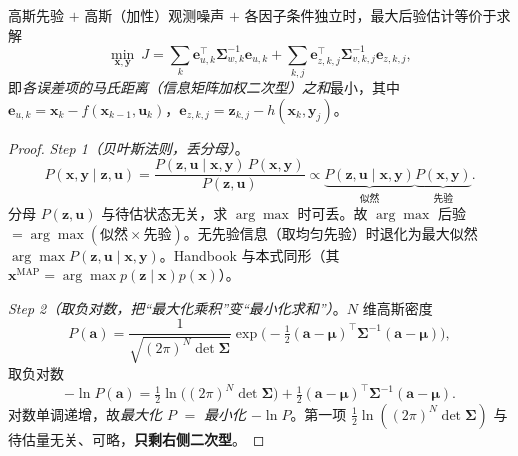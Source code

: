 \begin{theorem}\label{thm:nlopt-map}
高斯先验 $+$ 高斯（加性）观测噪声 $+$ 各因子条件独立时，最大后验估计等价于求解
\begin{equation}
  \min_{\mathbf{x},\mathbf{y}}\ J=\sum_k\mathbf{e}_{u,k}^\top\boldsymbol{\Sigma}_{w,k}^{-1}\mathbf{e}_{u,k}
  +\sum_{k,j}\mathbf{e}_{z,k,j}^\top\boldsymbol{\Sigma}_{v,k,j}^{-1}\mathbf{e}_{z,k,j},
  \label{eq:nlopt-batch-ls}
\end{equation}
即\emph{各误差项的马氏距离（信息矩阵加权二次型）之和}最小，其中 $\mathbf{e}_{u,k}=\mathbf{x}_k-f(\mathbf{x}_{k-1},\mathbf{u}_k)$，$\mathbf{e}_{z,k,j}=\mathbf{z}_{k,j}-h(\mathbf{x}_k,\mathbf{y}_j)$。
\end{theorem}
\begin{proof}
\emph{Step 1（贝叶斯法则，丢分母）}。
\begin{equation}
  P(\mathbf{x},\mathbf{y}\mid\mathbf{z},\mathbf{u})=\frac{P(\mathbf{z},\mathbf{u}\mid\mathbf{x},\mathbf{y})\,P(\mathbf{x},\mathbf{y})}{P(\mathbf{z},\mathbf{u})}\propto\underbrace{P(\mathbf{z},\mathbf{u}\mid\mathbf{x},\mathbf{y})}_{\text{似然}}\underbrace{P(\mathbf{x},\mathbf{y})}_{\text{先验}}.
  \label{eq:nlopt-bayes}
\end{equation}
分母 $P(\mathbf{z},\mathbf{u})$ 与待估状态无关，求 $\arg\max$ 时可丢。故 $\arg\max$ 后验 $=\arg\max(\text{似然}\times\text{先验})$。无先验信息（取均匀先验）时退化为最大似然 $\arg\max P(\mathbf{z},\mathbf{u}\mid\mathbf{x},\mathbf{y})$。Handbook\cite{carlone2026handbook} 与本式同形（其 $\mathbf{x}^{\text{MAP}}=\arg\max p(\mathbf{z}\mid\mathbf{x})p(\mathbf{x})$）。

\emph{Step 2（取负对数，把“最大化乘积”变“最小化求和”）}。$N$ 维高斯密度
\begin{equation}
  P(\mathbf{a})=\frac{1}{\sqrt{(2\pi)^N\det\boldsymbol{\Sigma}}}\exp\!\Big(-\tfrac12(\mathbf{a}-\boldsymbol{\mu})^\top\boldsymbol{\Sigma}^{-1}(\mathbf{a}-\boldsymbol{\mu})\Big),
  \label{eq:nlopt-gauss}
\end{equation}
取负对数
\begin{equation}
  -\ln P(\mathbf{a})=\tfrac12\ln\big((2\pi)^N\det\boldsymbol{\Sigma}\big)+\tfrac12(\mathbf{a}-\boldsymbol{\mu})^\top\boldsymbol{\Sigma}^{-1}(\mathbf{a}-\boldsymbol{\mu}).
  \label{eq:nlopt-neglog}
\end{equation}
对数单调递增，故\emph{最大化 $P$} $=$ \emph{最小化 $-\ln P$}。第一项 $\tfrac12\ln((2\pi)^N\det\boldsymbol{\Sigma})$ 与待估量无关、可略，\textbf{只剩右侧二次型}。


\end{proof}
